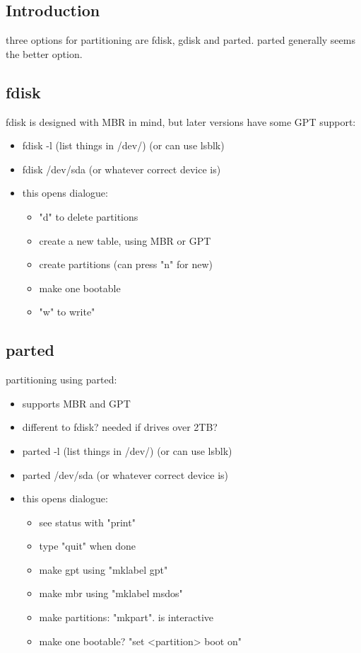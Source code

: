 
\subsection{Introduction}

three options for partitioning are fdisk, gdisk and parted. parted generally seems the better option.

\subsection{fdisk}

fdisk is designed with MBR in mind, but later versions have some GPT support:

\begin{itemize}
  \item fdisk -l (list things in /dev/) (or can use lsblk)
  \item fdisk /dev/sda (or whatever correct device is)
  \item this opens dialogue:
  \begin{itemize}
    \item "d" to delete partitions
    \item create a new table, using MBR or GPT
    \item create partitions (can press "n" for new)
    \item make one bootable
    \item "w" to write"
  \end{itemize}
\end{itemize}

\subsection{parted}

partitioning using parted:

\begin{itemize}
  \item supports MBR and GPT
  \item different to fdisk? needed if drives over 2TB?
  \item parted -l (list things in /dev/) (or can use lsblk)
  \item parted /dev/sda (or whatever correct device is)
  \item this opens dialogue:
  \begin{itemize}
    \item see status with "print"
    \item type "quit" when done
    \item make gpt using "mklabel gpt"
    \item make mbr using "mklabel msdos"
    \item make partitions: "mkpart". is interactive
    \item make one bootable? "set <partition> boot on"
  \end{itemize}
\end{itemize}
  
